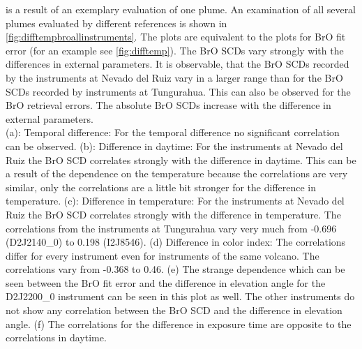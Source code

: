 \documentclass  [
  paper    = a4,
  BCOR     = 10mm,
  twoside,
  fontsize = 12pt,
  fleqn,
  toc      = bibnumbered,
  toc      = listofnumbered,
  numbers  = noendperiod,
  headings = normal,
  listof   = leveldown,
  version  = 3.03
]                                       {scrreprt}
\begin{document}
 is a result of an exemplary evaluation of one plume. An examination of all several plumes evaluated by different references is shown in \cref{fig:difftempbroallinstruments}. The plots are equivalent to the plots for BrO fit error (for an example see \cref{fig:difftemp}). The BrO SCDs vary strongly with the differences in external parameters. It is observable, that the BrO SCDs recorded by the instruments at Nevado del Ruiz vary in a larger range than for the BrO SCDs recorded by instruments at Tungurahua. This can also be observed for the BrO retrieval errors. The absolute BrO SCDs increase with the difference in external parameters.\\
 (a): Temporal difference: For the temporal difference no significant correlation can be observed.
%
 (b): Difference in daytime: For the instruments at Nevado del Ruiz the BrO SCD correlates strongly with the difference in daytime. This can be a result of the dependence on the temperature because the correlations are very similar, only the correlations are a little bit stronger for the difference in temperature.
 (c): Difference in temperature: For the instruments at Nevado del Ruiz the BrO SCD correlates strongly with the difference in temperature. The correlations from the instruments at Tungurahua vary very much from -0.696 (D2J2140\_0) to 0.198 (I2J8546).
%
 (d) Difference in color index: The correlations differ for every instrument even for instruments of the same volcano. The correlations vary from -0.368 to 0.46.
%
 (e) The strange dependence which can be seen between the BrO fit error and the difference in elevation angle for the D2J2200\_0 instrument can be seen in this plot as well. The other instruments do not show any correlation between the BrO SCD and the difference in elevation angle.
%
 (f) The correlations for the difference in exposure time are opposite to the correlations in daytime. 
\end{document}
